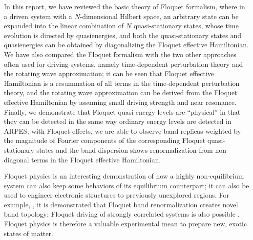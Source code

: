 \documentclass[hyperref, a4paper]{article}
\begin{document}
In this report,
we have reviewed the basic theory of Floquet formalism, 
where in a driven system with a $N$-dimensional Hilbert space, 
an arbitrary state can be expanded into 
the linear combination of $N$ quasi-stationary states, 
whose time evolution is directed by quasienergies,
and both the quasi-stationary states and quasienergies can be obtained 
by diagonalizing the Floquet effective Hamiltonian.
We have also compared the Floquet formalism with the two other approaches often used for driving systems, 
namely time-dependent perturbation theory and the rotating wave approximation;
it can be seen that Floquet effective Hamiltonian is a resummation of 
all terms in the time-dependent perturbation theory, 
and the rotating wave approximation can be derived from the Floquet effective Hamiltonian 
by assuming small driving strength and near resonance.
Finally, we demonstrate that Floquet quasi-energy levels are ``physical''
in that they can be detected in the same way 
ordinary energy levels are detected in ARPES; 
with Floquet effects, we are able to observe band replicas 
weighted by the magnitude of Fourier components of the corresponding Floquet quasi-stationary states
and the band dispersion shows renormalization from non-diagonal terms in the Floquet effective Hamiltonian.

Floquet physics is an interesting demonstration of how a highly non-equilibrium system 
can also keep some behaviors of its equilibrium counterpart; 
it can also be used to engineer electronic structures to previously unexplored regions.
For example, \cite{rudner2020band}, it is demonstrated that 
Floquet band renormalization creates novel band topology;
Floquet driving of strongly correlated systems is also possible
\cite{oka2019floquet}.
Floquet physics is therefore a valuable experimental mean to prepare new, exotic states of matter.

\printbibliography
\end{document}
